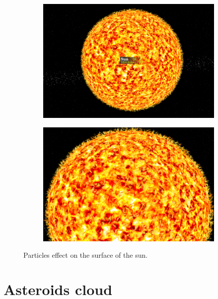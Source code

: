 \documentclass[paper=a4, fontsize=11pt]{scrartcl} %
\numberwithin{equation}{section} %
\numberwithin{figure}{section} %
\numberwithin{table}{section} %
\theoremstyle{definition}
\begin{document}
\begin{figure}
	\centering
	\begin{subfigure}{.48\textwidth}
		\centering
		\includegraphics[width=1.0\linewidth]{images/sun1.png}
	\end{subfigure}
	\begin{subfigure}{.48\textwidth}
		\centering
		\includegraphics[width=1.0\linewidth]{images/sun2.png}
	\end{subfigure}
	\caption{Particles effect on the surface of the sun.}
	\label{fig:meteorites}
\end{figure}


\section{Asteroids cloud}
\end{document}
